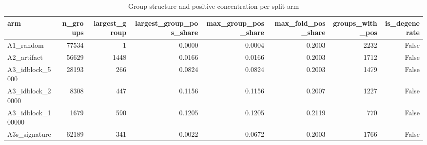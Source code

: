 \begin{table}
\caption{Group structure and positive concentration per split arm}
\label{tab:tab_group_diagnostics}
\begin{tabular}{lrrrrrrr}
\toprule
arm & n\_groups & largest\_group & largest\_group\_pos\_share & max\_group\_pos\_share & max\_fold\_pos\_share & groups\_with\_pos & is\_degenerate \\
\midrule
A1\_random & 77534 & 1 & 0.0000 & 0.0004 & 0.2003 & 2232 & False \\
A2\_artifact & 56629 & 1448 & 0.0166 & 0.0166 & 0.2003 & 1712 & False \\
A3\_idblock\_5000 & 28193 & 266 & 0.0824 & 0.0824 & 0.2003 & 1479 & False \\
A3\_idblock\_20000 & 8308 & 447 & 0.1156 & 0.1156 & 0.2007 & 1227 & False \\
A3\_idblock\_100000 & 1679 & 590 & 0.1205 & 0.1205 & 0.2119 & 770 & False \\
A3s\_signature & 62189 & 341 & 0.0022 & 0.0672 & 0.2003 & 1766 & False \\
\bottomrule
\end{tabular}
\end{table}
